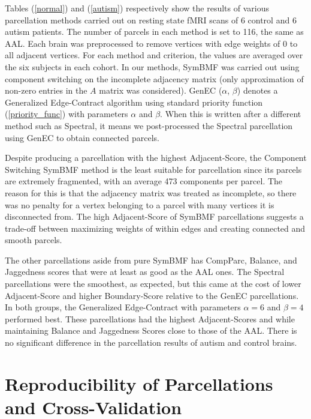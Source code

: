 Tables (\ref{normal}) and (\ref{autism}) respectively show the results
of various parcellation methods carried out on resting state fMRI scans
of 6 control and 6 autism patients. The number of parcels in each
method is set to 116, the same as AAL. Each brain was preprocessed to
remove vertices with edge weights of 0 to all adjacent vertices. For
each method and criterion, the values are averaged over the six 
subjects in each cohort. In our methods, SymBMF was carried out using
component switching on the incomplete adjacency matrix (only
approximation of non-zero entries in the $A$ matrix was considered).
GenEC ($\alpha$, $\beta$) denotes a Generalized Edge-Contract
algorithm using standard priority function (\ref{priority_func}) with
parameters $\alpha$ and $\beta$. When this is written after a different
method such as Spectral, it means we post-processed the Spectral
parcellation using GenEC to obtain connected parcels.

Despite producing a parcellation with the highest Adjacent-Score, the
Component Switching SymBMF method is the least suitable for parcellation
since its parcels are extremely fragmented, with an average 473
components per parcel. The reason for this is that the adjacency matrix
was treated as incomplete, so there was no penalty for a vertex
belonging to a parcel with many vertices it is disconnected from.
The high Adjacent-Score of SymBMF parcellations suggests a trade-off
between maximizing weights of within edges and creating connected and
smooth parcels.

The other parcellations aside from pure SymBMF has CompParc, Balance,
and Jaggedness scores that were at least as good as the AAL ones.
The Spectral parcellations were the smoothest, as expected, but this
came at the cost of lower Adjacent-Score and higher Boundary-Score
relative to the GenEC parcellations.
In both groups, the Generalized Edge-Contract with parameters
$\alpha = 6$ and $\beta = 4$ performed best. These parcellations had
the highest Adjacent-Scores and while maintaining Balance and
Jaggedness Scores close to those of the AAL. There is no significant
difference in the parcellation results of autism and control brains.

\section{Reproducibility of Parcellations and Cross-Validation}

